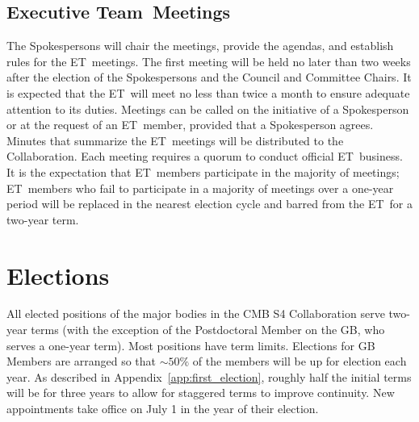 \documentclass[12pt]{article}
\newcommand{\exec}{{Executive Team}}
\newcommand{\shorte}{{ET}}  %
\begin{document}


\subsection{\exec \ Meetings}

The Spokespersons will chair the meetings, provide the agendas, and establish rules for the \shorte\ meetings. The first meeting will be held no later than two weeks after the election of the Spokespersons and the Council and Committee Chairs. It is expected that the \shorte\ will meet no less than twice a month to ensure adequate attention to its duties. Meetings can be called on the initiative of a Spokesperson or at the request of an \shorte\ member, provided that a Spokesperson agrees. Minutes that summarize the \shorte\ meetings will be distributed to the Collaboration. Each meeting requires a quorum to conduct official \shorte\ business.  It is the expectation that \shorte\ members participate in the majority of meetings; \shorte\ members who fail to participate %
in a majority of meetings over a one-year period will be replaced in the nearest election cycle and barred from the \shorte\ for a two-year term.  


\section{Elections}\label{sec:elections}
All elected positions of the major bodies in the CMB S4 Collaboration serve two-year terms (with the exception of the Postdoctoral Member on the GB, who serves a one-year term). Most positions have term limits.  Elections for %
GB Members are  arranged so that $\sim 50\%$ of the members will be up for election each year.  As described in Appendix~\ref{app:first_election}, roughly half the initial terms will be for three years to allow for staggered terms to improve continuity. 
 New appointments take office on July 1 in the year of their election.  

\end{document}
